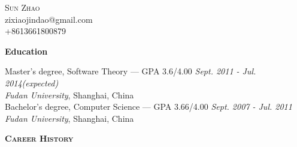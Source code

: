 \documentclass[9pt]{article}
\newenvironment{changemargin}[2]{%
  \begin{list}{}{%
    \setlength{\topsep}{0pt}%
    \setlength{\leftmargin}{#1}%
    \setlength{\rightmargin}{#2}%
    \setlength{\listparindent}{\parindent}%
    \setlength{\itemindent}{\parindent}%
    \setlength{\parsep}{\parskip}%
  }%
  \item[]}{\end{list}
}
\newcommand{\lineover}{
	\begin{changemargin}{-0.05in}{-0.05in}
		\vspace*{-8pt}
		\hrulefill \\
		\vspace*{-2pt}
	\end{changemargin}
}
\newcommand{\header}[1]{
	\begin{changemargin}{-0.5in}{-0.5in}
		\scshape{#1}\\
  	\lineover
	\end{changemargin}
}
\newcommand{\contact}[4]{
	\begin{changemargin}{-0.5in}{-0.5in}
		\begin{center}
			{\Large \scshape {#1}}\\ \smallskip
			{#2}\\ \smallskip
			{#3}\\ \smallskip
			{#4}\smallskip
		\end{center}
	\end{changemargin}
}
\newenvironment{body} {
	\vspace*{-16pt}
	\begin{changemargin}{-0.25in}{-0.5in}
  }	
	{\end{changemargin}
}
\begin{document}
\thispagestyle{empty}
\contact{Sun Zhao}{zixiaojindao@gmail.com}{+8613661800879}


%
%


\header{\textbf{Education}}

\begin{body}
	\vspace{14pt}
	Master's degree, Software Theory --- GPA 3.6/4.00 \hfill \emph{Sept. 2011 - Jul. 2014(expected)} \\
	\emph{Fudan University}, Shanghai, China \\
  \medskip
	Bachelor's degree, Computer Science --- GPA 3.66/4.00 \hfill \emph{Sept. 2007 - Jul. 2011} \\
	\emph{Fudan University}, Shanghai, China\\
\end{body}

\smallskip


\header{\textbf{Career History}}
\end{document}
